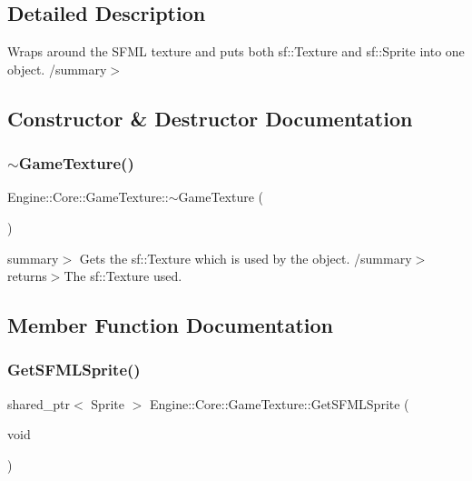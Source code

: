 \subsection{Detailed Description}
Wraps around the S\+F\+ML texture and puts both sf\+::\+Texture and sf\+::\+Sprite into one object. /summary$>$ 

\subsection{Constructor \& Destructor Documentation}
\mbox{\label{class_engine_1_1_core_1_1_game_texture_a37c2ee2ebfdfc3301b6070d2df10d59a}} 
\subsubsection{\texorpdfstring{$\sim$\+Game\+Texture()}{~GameTexture()}}
{\footnotesize\ttfamily Engine\+::\+Core\+::\+Game\+Texture\+::$\sim$\+Game\+Texture (\begin{DoxyParamCaption}{ }\end{DoxyParamCaption})}

summary$>$ Gets the sf\+::\+Texture which is used by the object. /summary$>$ returns$>$The sf\+::\+Texture used.

\subsection{Member Function Documentation}
\mbox{\label{class_engine_1_1_core_1_1_game_texture_aec2df0beae7b8693160e20c1fd3588ac}} 
\subsubsection{\texorpdfstring{Get\+S\+F\+M\+L\+Sprite()}{GetSFMLSprite()}}
{\footnotesize\ttfamily shared\+\_\+ptr$<$ Sprite $>$ Engine\+::\+Core\+::\+Game\+Texture\+::\+Get\+S\+F\+M\+L\+Sprite (\begin{DoxyParamCaption}\item[{void}]{ }\end{DoxyParamCaption})}

